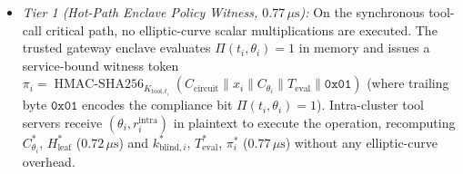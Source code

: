 \documentclass[conference,10pt]{IEEEtran}
\begin{document}
\begin{itemize}
    \item \emph{Tier 1 (Hot-Path Enclave Policy Witness, $0.77\,\mu\text{s}$):} On the synchronous tool-call critical path, no elliptic-curve scalar multiplications are executed. The trusted gateway enclave evaluates $\Pi(t_i, \theta_i) = 1$ in memory and issues a service-bound witness token $\pi_i = \operatorname{HMAC-SHA256}_{K_{\text{tool}, t_i}}(C_{\text{circuit}} \parallel x_i \parallel C_{\theta_i} \parallel T_{\text{eval}} \parallel \mathtt{0x01})$ (where trailing byte $\mathtt{0x01}$ encodes the compliance bit $\Pi(t_i, \theta_i) = 1$). Intra-cluster tool servers receive $(\theta_i, r_i^{\text{intra}})$ in plaintext to execute the operation, recomputing $C_{\theta_i}^*$, $H_{\text{leaf}}^*$ ($0.72\,\mu\text{s}$) and $k_{\text{blind}, i}^*$, $T_{\text{eval}}^*$, $\pi_i^*$ ($0.77\,\mu\text{s}$) without any elliptic-curve overhead.

\end{itemize}
\end{document}
